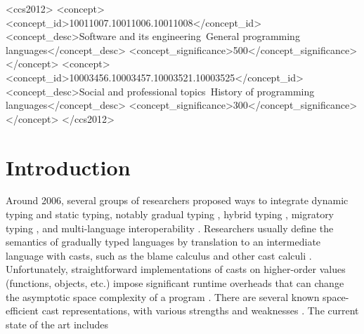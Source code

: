 \documentclass[acmsmall,review]{acmart}\settopmatter{printfolios=true,printccs=false,printacmref=false}
\begin{document}
\begin{CCSXML}
<ccs2012>
<concept>
<concept_id>10011007.10011006.10011008</concept_id>
<concept_desc>Software and its engineering~General programming 
languages</concept_desc>
<concept_significance>500</concept_significance>
</concept>
<concept>
<concept_id>10003456.10003457.10003521.10003525</concept_id>
<concept_desc>Social and professional topics~History of programming 
languages</concept_desc>
<concept_significance>300</concept_significance>
</concept>
</ccs2012>
\end{CCSXML}





\maketitle

\section{Introduction}

Around 2006, several groups of researchers proposed ways to integrate
dynamic typing and static typing, notably gradual typing
\citep{siek2006gradual}, hybrid typing \citep{knowles2010hybrid},
migratory typing \citep{Tobin-Hochstadt:2006fk}, and multi-language
interoperability \citep{Gray:2005ij,Matthews:2007zr}. Researchers
usually define the semantics of gradually typed languages by
translation to an intermediate language with casts, such as the blame
calculus \citep{wadler2009well} and other cast calculi
\citep{siek2009exploring}. Unfortunately, straightforward
implementations of casts on higher-order values (functions, objects,
etc.) impose significant runtime overheads that can change the
asymptotic space complexity of a program
\citep{herman2010space}. There are several known space-efficient cast
representations, with various strengths and weaknesses
\citep{Siek:2015:BCT:2737924.2737968,Siek:2010:TWB:1706299.1706342,Garcia:2013:CTB:2500365.2500603,kuhlenschmidt2018efficient,siek2012interpretations,garcia2014deriving}.
The current state of the art includes
\end{document}
